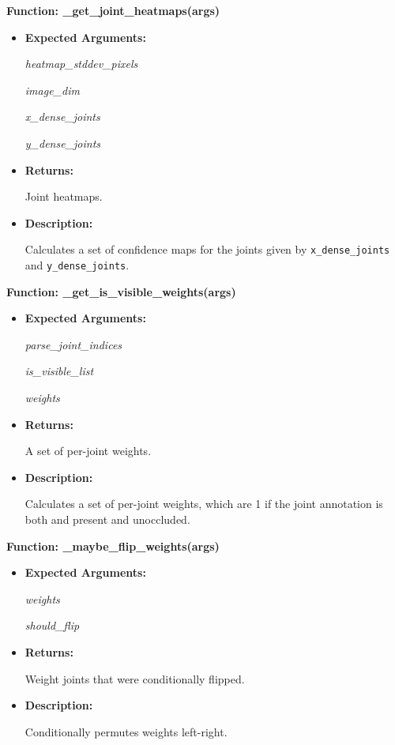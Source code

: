 \documentclass{scrreprt}
\begin{document}
\textbf{Function: \_get\_joint\_heatmaps(args)}
\begin{itemize}
    \item \textbf{Expected Arguments:}

            \quad\textit{heatmap\_stddev\_pixels}

            \quad\textit{image\_dim}

            \quad\textit{x\_dense\_joints}

            \quad\textit{y\_dense\_joints}

    \item \textbf{Returns:}

            Joint heatmaps.

    \item \textbf{Description:}

            Calculates a set of confidence maps for the joints given by \verb|x_dense_joints| and \verb|y_dense_joints|.
\end{itemize}

\textbf{Function: \_get\_is\_visible\_weights(args)}
\begin{itemize}
    \item \textbf{Expected Arguments:}

            \quad\textit{parse\_joint\_indices}

            \quad\textit{is\_visible\_list}

            \quad\textit{weights}

    \item \textbf{Returns:}

            A set of per-joint weights.

    \item \textbf{Description:}

            Calculates a set of per-joint weights, which are 1 if the joint annotation is both and present and unoccluded.

\end{itemize}

\textbf{Function: \_maybe\_flip\_weights(args)}
\begin{itemize}
    \item \textbf{Expected Arguments:}

            \quad\textit{weights}

            \quad\textit{should\_flip}

    \item \textbf{Returns:}

            Weight joints that were conditionally flipped.

    \item \textbf{Description:}

            Conditionally permutes weights left-right.

\end{itemize}
\end{document}
